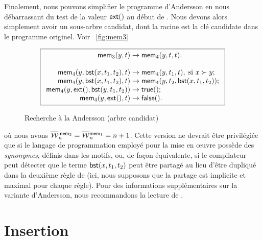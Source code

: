 Finalement, nous pouvons simplifier le programme d'Andersson en nous
débarrassant du test de la valeur \(\textsf{ext}()\) au début de
. Nous devons alors
simplement avoir un sous-arbre candidat, dont la racine est la clé
candidate dans le programme originel. Voir \fig~\vref{fig:mem3}
\begin{figure}
\begin{equation*}
\boxed{
\begin{array}{r@{\;}l@{\;}l}
  \fun{mem}_3(y,t) & \rightarrow & \fun{mem}_4(y,t,t).\\
  \\
  \fun{mem}_4(y,\fun{bst}(x,t_1,t_2),t) & \rightarrow &
  \fun{mem}_4(y,t_1,t),\; \text{si \(x \succ y\)};\\
\fun{mem}_4(y,\fun{bst}(x,t_1,t_2),t) & \rightarrow &
  \fun{mem}_4(y,t_2,\fun{bst}(x,t_1,t_2));\\
\fun{mem}_4(y,\fun{ext}(),\fun{bst}(y,t_1,t_2)) & \rightarrow & \fun{true}();\\
\fun{mem}_4(y,\fun{ext}(),t) & \rightarrow & \fun{false}().
\end{array}}
\end{equation*}
\caption{Recherche à la Andersson (arbre candidat)}
\label{fig:mem3}
\end{figure}
où nous avons \(\OW{\fun{mem}_3}{n} = \OW{\fun{mem}_1}{n} = n + 1\).
Cette version ne devrait être privilégiée que si le langage de
programmation employé pour la mise en {\oe}uvre possède des
\emph{synonymes}, définis dans les motifs, ou,
de façon équivalente, si le compilateur peut détecter que le terme
\(\textsf{bst}(x,t_1,t_2)\) peut être partagé au lieu d'être dupliqué
dans la deuxième règle de  (ici, nous supposons que
la partage est implicite et maximal pour chaque
règle). Pour des informations
supplémentaires sur la variante d'Andersson, nous recommandons la
lecture de \cite{Spuler_1992}.


\section{Insertion}
\label{sec:bst_insertion}



